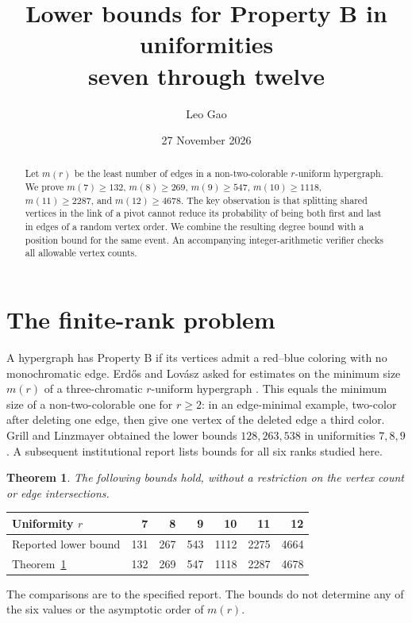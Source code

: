 \documentclass[11pt,a4paper]{article}
\title{Lower bounds for Property B in uniformities\\ seven through twelve}
\author{Leo Gao}
\date{27 November 2026}
\newtheorem{theorem}{Theorem}\newtheorem{lemma}[theorem]{Lemma}
\begin{document}
\maketitle
\begin{abstract}
Let $m(r)$ be the least number of edges in a non-two-colorable $r$-uniform hypergraph. We prove $m(7)\ge132$, $m(8)\ge269$, $m(9)\ge547$, $m(10)\ge1118$, $m(11)\ge2287$, and $m(12)\ge4678$. The key observation is that splitting shared vertices in the link of a pivot cannot reduce its probability of being both first and last in edges of a random vertex order. We combine the resulting degree bound with a position bound for the same event. An accompanying integer-arithmetic verifier checks all allowable vertex counts.
\end{abstract}
\section{The finite-rank problem}
A hypergraph has Property B if its vertices admit a red--blue coloring with no monochromatic edge. Erd\H os and Lov\'asz asked for estimates on the minimum size $m(r)$ of a three-chromatic $r$-uniform hypergraph \cite{el}. This equals the minimum size of a non-two-colorable one for $r\ge2$: in an edge-minimal example, two-color after deleting one edge, then give one vertex of the deleted edge a third color. Grill and Linzmayer \cite{gl} obtained the lower bounds $128,263,538$ in uniformities $7,8,9$. A subsequent institutional report \cite{sii} lists bounds for all six ranks studied here.
\begin{theorem}\label{th:main}
The following bounds hold, without a restriction on the vertex count or edge intersections.
\end{theorem}
\begin{center}
\begin{tabular}{lrrrrrr}\toprule
Uniformity $r$&7&8&9&10&11&12\\\midrule
Reported lower bound \cite{sii}&131&267&543&1112&2275&4664\\
Theorem~\ref{th:main}&132&269&547&1118&2287&4678\\\bottomrule
\end{tabular}
\end{center}
The comparisons are to the specified report. The bounds do not determine any of the six values or the asymptotic order of $m(r)$.
\end{document}
